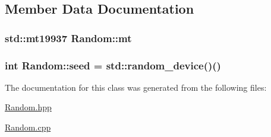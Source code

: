 \subsection{Member Data Documentation}
\hypertarget{class_random_aa4354db31fa7d64040939b905ab12ee1}{
\subsubsection[{mt}]{\setlength{\rightskip}{0pt plus 5cm}std\-::mt19937 Random\-::mt\hspace{0.3cm}{\ttfamily [static]}}}\label{class_random_aa4354db31fa7d64040939b905ab12ee1}
\hypertarget{class_random_a046dccc4dc6055ffd3e90d597beb8620}{
\subsubsection[{seed}]{\setlength{\rightskip}{0pt plus 5cm}int Random\-::seed = std\-::random\-\_\-device()()\hspace{0.3cm}{\ttfamily [static]}}}\label{class_random_a046dccc4dc6055ffd3e90d597beb8620}


The documentation for this class was generated from the following files\-:\begin{DoxyCompactItemize}
\item 
\hyperlink{_random_8hpp}{Random.\-hpp}\item 
\hyperlink{_random_8cpp}{Random.\-cpp}\end{DoxyCompactItemize}
